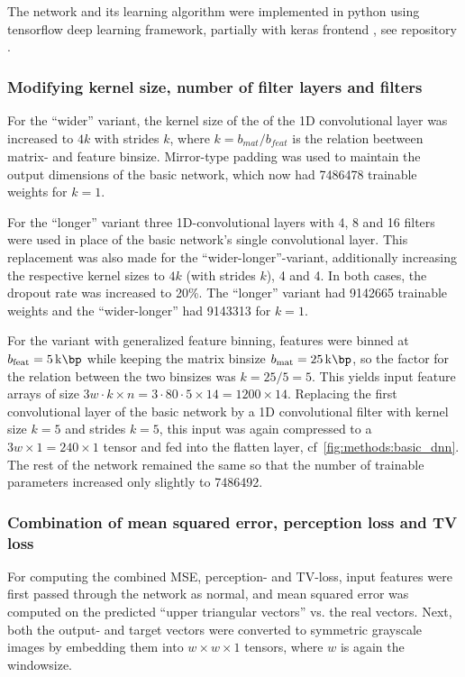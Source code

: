 The network and its learning algorithm were implemented in python using tensorflow deep learning framework, partially with keras frontend \cite{Abadi2015,Chollet2015}, 
see repository \xxx.

\subsubsection{Modifying kernel size, number of filter layers and filters} \label{sec:methods:variants}
For the ``wider'' variant, the kernel size of the of the 1D convolutional layer was increased to $4k$ with strides $k$,
where $k=b_\mathit{mat}/b_\mathit{feat}$ is the relation beetween matrix- and feature binsize.
Mirror-type padding was used to maintain the output dimensions of the basic network, which now had \SI{7486478}{} trainable weights
for $k=1$.

For the ``longer'' variant three 1D-convolutional layers with 4, 8 and 16 filters 
were used in place of the basic network's single convolutional layer.
This replacement was also made for the ``wider-longer''-variant, 
additionally increasing the respective kernel sizes to $4k$ (with strides $k$), 4 and 4.
In both cases, the dropout rate was increased to 20\%.
The ``longer'' variant had \SI{9142665}{} trainable weights and the ``wider-longer''
had \SI{9143313}{} for $k=1$.

For the variant with generalized feature binning, features were binned at $b_\textrm{feat} = \SI{5}{\kilo\bp}$ while keeping the matrix binsize $b_\textrm{mat} = \SI{25}{\kilo\bp}$,
so the factor for the relation between the two binsizes was $k=25/5=5$.
This yields input feature arrays of size $3w\cdot k \times n = 3\cdot80\cdot5 \times 14 = 1200\times 14$.
Replacing the first convolutional layer of the basic network by a 1D convolutional filter with kernel size $k=5$ and strides $k=5$,
this input was again compressed to a $3w\times 1 = 240\times 1$ tensor and fed into the flatten layer, cf~\cref{fig:methods:basic_dnn}. 
The rest of the network remained the same so that the number of trainable parameters increased only slightly to \SI{7486492}{}.

\subsubsection{Combination of mean squared error, perception loss and TV loss} \label{sec:methods:combined_loss}
For computing the combined MSE, perception- and TV-loss,
input features were first passed through the network as normal,
and mean squared error was computed on the predicted ``upper triangular vectors'' vs. the real vectors.
Next, both the output- and target vectors were converted to symmetric grayscale images by embedding them into 
$w \times w \times 1$ tensors, where $w$ is again the windowsize.

